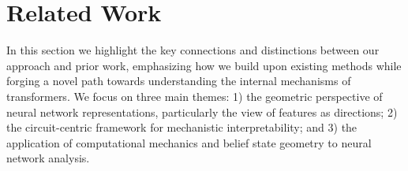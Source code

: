 \section{Related Work}
In this section we highlight the key connections and distinctions between our approach and prior work, emphasizing how we build upon existing methods while forging a novel path towards understanding the internal mechanisms of transformers. We 
focus on
three main themes: 1) the geometric perspective of neural network representations, particularly the view of features as directions; 2) the circuit-centric framework for mechanistic interpretability; and 3) the application of computational mechanics and belief state geometry to neural network analysis. 

